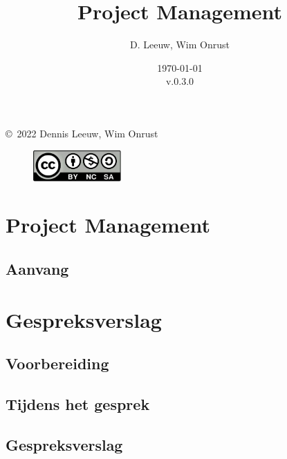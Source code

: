 \documentclass[a4paper,12pt,twoside,openright,titlepage]{book}
\author{D. Leeuw, Wim Onrust}
\title{Project Management}
\date{\today\\v.0.3.0}
\begin{document}

\maketitle

\copyright\ 2022 Dennis Leeuw, Wim Onrust\\

\begin{figure}
\includegraphics[width=0.3\textwidth]{CC-BY-SA-NC.png}
\end{figure}

\bigskip




\frontmatter
%
%

\tableofcontents

\mainmatter

\chapter{Project Management}

\section{Aanvang}


\chapter{Gespreksverslag}

\section{Voorbereiding}

\section{Tijdens het gesprek}

\section{Gespreksverslag}

\end{document}
